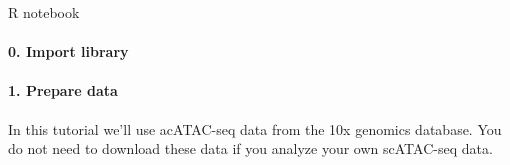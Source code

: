 \documentclass[letterpaper,10pt,english]{sphinxmanual}
\begin{document}
R notebook


\paragraph{0. Import library}
\label{\detokenize{notebooks/01_ATAC-seq_data_processing/option1_scATAC-seq_data_analysis_with_cicero/01_atacdata_to_cicero:0.-Import-library}}\label{\detokenize{notebooks/01_ATAC-seq_data_processing/option1_scATAC-seq_data_analysis_with_cicero/01_atacdata_to_cicero::doc}}
{
\begin{sphinxVerbatim}[commandchars=\\\{\}]
\llap{\color{nbsphinxin}[2]:\,\hspace{\fboxrule}\hspace{\fboxsep}}
\end{sphinxVerbatim}
}


\paragraph{1. Prepare data}
\label{\detokenize{notebooks/01_ATAC-seq_data_processing/option1_scATAC-seq_data_analysis_with_cicero/01_atacdata_to_cicero:1.-Prepare-data}}
In this tutorial we’ll use acATAC-seq data from the 10x genomics database. You do not need to download these data if you analyze your own scATAC-seq data.

{
\begin{sphinxVerbatim}[commandchars=\\\{\}]
\llap{\color{nbsphinxin}[4]:\,\hspace{\fboxrule}\hspace{\fboxsep}}


\end{sphinxVerbatim}
}
\end{document}
